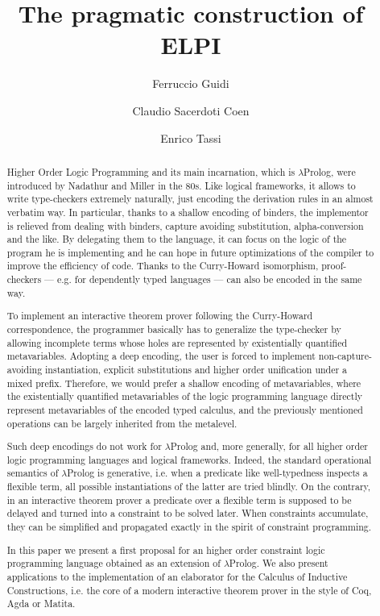\documentclass{easychair}
\title{The pragmatic construction of ELPI}
\author{Ferruccio Guidi \and Claudio Sacerdoti Coen \and Enrico Tassi}
\institute{
  Department of Computer Science, University of Bologna \email{...} \and
  Department of Computer Science, University of Bologna \email{...} \and
  Inria Sophia-Antipolis, \email{Enrico.Tassi@inria.fr}}
\begin{document}
\maketitle

\begin{abstract}
Higher Order Logic Programming and its main incarnation, which is $\lambda$Prolog, were introduced by Nadathur and Miller in the 80s. Like logical frameworks, it allows to write type-checkers extremely naturally, just encoding the derivation rules in an almost verbatim way. In particular, thanks to a shallow encoding of binders, the implementor is relieved from dealing with binders, capture avoiding substitution, alpha-conversion and the like. By delegating them to the language, it can focus on the logic of the program he is implementing and he can hope in future optimizations of the compiler to improve the efficiency of code. Thanks to the Curry-Howard isomorphism, proof-checkers --- e.g. for dependently typed languages --- can also be encoded in the same way.

To implement an interactive theorem prover following the Curry-Howard correspondence, the programmer basically has to generalize the type-checker by allowing incomplete terms whose holes are represented by existentially quantified metavariables. Adopting a deep encoding, the user is forced to implement non-capture-avoiding instantiation, explicit substitutions and higher order unification under a mixed prefix. Therefore, we would prefer a shallow encoding of metavariables, where the existentially quantified metavariables of the logic programming language directly represent metavariables of the encoded typed calculus, and the previously mentioned operations can be largely inherited from the metalevel.

Such deep encodings do not work for $\lambda$Prolog and, more generally, for all higher order logic programming languages and logical frameworks. Indeed, the standard operational semantics of $\lambda$Prolog is generative, i.e. when a predicate like well-typedness inspects a flexible term, all possible instantiations of the latter are tried blindly. On the contrary, in an interactive theorem prover a predicate over a flexible term is supposed to be delayed and turned into a constraint to be solved later. When constraints accumulate, they can be simplified and propagated exactly in the spirit of constraint programming.

In this paper we present a first proposal for an higher order constraint logic
programming language obtained as an extension of $\lambda$Prolog. We also present
applications to the implementation of an elaborator for the Calculus of
Inductive Constructions, i.e. the core of a modern interactive theorem prover
in the style of Coq, Agda or Matita.
\end{abstract}
\end{document}
